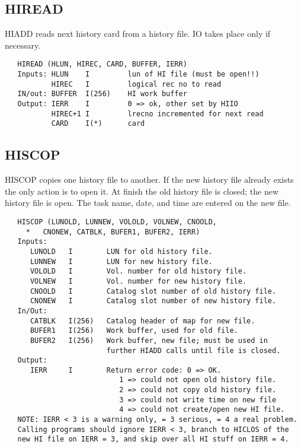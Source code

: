 \subsection{HIREAD}
HIADD reads next history card from a history file.
IO takes place only if necessary.
\begin{verbatim}
   HIREAD (HLUN, HIREC, CARD, BUFFER, IERR)
   Inputs: HLUN    I         lun of HI file (must be open!!)
           HIREC   I         logical rec no to read
   IN/out: BUFFER  I(256)    HI work buffer
   Output: IERR    I         0 => ok, other set by HIIO
           HIREC+1 I         lrecno incremented for next read
           CARD    I(*)      card
\end{verbatim}


\subsection{HISCOP}
HISCOP copies one history file to another.  If the new history
file already exists the only action is to open it.  At finish
the old history file is closed; the new history file is open.
The task name, date, and time are entered on the new file.
\begin{verbatim}
   HISCOP (LUNOLD, LUNNEW, VOLOLD, VOLNEW, CNOOLD,
     *   CNONEW, CATBLK, BUFER1, BUFER2, IERR)
   Inputs:
      LUNOLD   I        LUN for old history file.
      LUNNEW   I        LUN for new history file.
      VOLOLD   I        Vol. number for old history file.
      VOLNEW   I        Vol. number for new history file.
      CNOOLD   I        Catalog slot number of old history file.
      CNONEW   I        Catalog slot number of new history file.
   In/Out:
      CATBLK   I(256)   Catalog header of map for new file.
      BUFER1   I(256)   Work buffer, used for old file.
      BUFER2   I(256)   Work buffer, new file; must be used in
                        further HIADD calls until file is closed.
   Output:
      IERR     I        Return error code: 0 => OK.
                           1 => could not open old history file.
                           2 => could not copy old history file.
                           3 => could not write time on new file
                           4 => could not create/open new HI file.
   NOTE: IERR < 3 is a warning only, = 3 serious, = 4 a real problem.
   Calling programs should ignore IERR < 3, branch to HICLOS of the
   new HI file on IERR = 3, and skip over all HI stuff on IERR = 4.
\end{verbatim}

